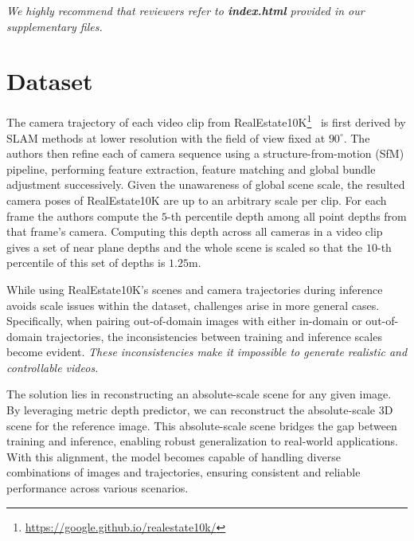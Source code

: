 \clearpage
\setcounter{page}{1}
\maketitlesupplementary
\appendix

\textit{We highly recommend that reviewers refer to 
\textbf{index.html} provided in our supplementary files.}

\section{Dataset}

The camera trajectory of each video clip from RealEstate10K\footnote{\url{https://google.github.io/realestate10k/}}~\cite{zhou2018stereo} is first derived by SLAM methods at lower resolution with the field of view fixed at \(90^\circ\).
The authors then refine each of camera sequence using a structure-from-motion (SfM) pipeline, performing feature extraction, feature matching and global bundle adjustment successively.
Given the unawareness of global scene scale, the resulted camera poses of RealEstate10K are up to an arbitrary scale per clip.
For each frame the authors compute the \(5\)-th percentile depth among all point depths from that frame’s camera. 
Computing this depth across all cameras in a video clip gives a set of near plane depths and the whole scene is scaled so that the \(10\)-th percentile of this set of depths is \(1.25\)m. 

While using RealEstate10K's scenes and camera trajectories during inference avoids scale issues within the dataset, challenges arise in more general cases. Specifically, when pairing out-of-domain images with either in-domain or out-of-domain trajectories, the inconsistencies between training and inference scales become evident. \textit{These inconsistencies make it impossible to generate realistic and controllable videos.}

The solution lies in reconstructing an absolute-scale scene for any given image. By leveraging metric depth predictor, we can reconstruct the absolute-scale 3D scene for the reference image. This absolute-scale scene bridges the gap between training and inference, enabling robust generalization to real-world applications. With this alignment, the model becomes capable of handling diverse combinations of images and trajectories, ensuring consistent and reliable performance across various scenarios.



